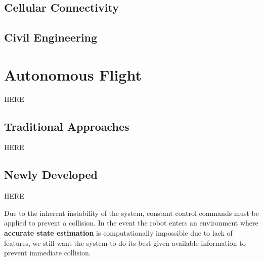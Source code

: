 

\subsection{Cellular Connectivity}



\subsection{Civil Engineering}




\section{Autonomous Flight}

HERE

\subsection{Traditional Approaches}

HERE


\subsection{Newly Developed}
HERE


Due to the inherent instability of the system, constant control commands must be applied to
prevent a collision. In the event the robot enters an environment where \textbf{accurate state estimation}
is computationally impossible due to lack of features, we still want the system to do its best given
available information to prevent immediate collision.